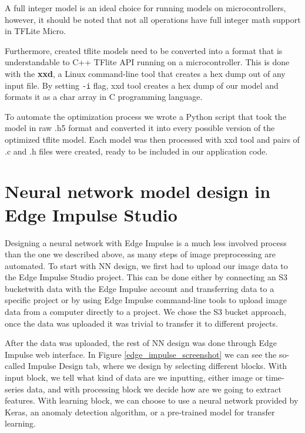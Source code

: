 A full integer model is an ideal choice for running models on microcontrollers, however, it should be noted that not all operations have full integer math support in TFLite Micro.

Furthermore, created tflite models need to be converted into a format that is understandable to C++ TFlite API running on a microcontroller.
This is done with the \textbf{xxd}, a Linux command-line tool that creates a hex dump out of any input file.
By setting \verb|-i| flag, xxd tool creates a hex dump of our model and formats it as a char array in C programming language. 

To automate the optimization process we wrote a Python script that took the model in raw .h5 format and converted it into every possible version of the optimized tflite model.
Each model was then processed with xxd tool and pairs of .c and .h files were created, ready to be included in our application code.


\section{ Neural network model design in Edge Impulse Studio}

Designing a neural network with Edge Impulse is a much less involved process than the one we described above, as many steps of image preprocessing are automated.
To start with NN design, we first had to upload our image data to the Edge Impulse Studio project.
This can be done either by connecting an S3 bucket\footnotemark with data with the Edge Impulse account and transferring data to a specific project or by using Edge Impulse command-line tools to upload image data from a computer directly to a project.
We chose the S3 bucket approach, once the data was uploaded it was trivial to transfer it to different projects.


After the data was uploaded, the rest of NN design was done through Edge Impulse web interface.
In Figure \ref{edge_impulse_screenshot} we can see the so-called Impulse Design tab, where we design by selecting different blocks.
With input block, we tell what kind of data are we inputting, either image or time-series data, and with processing block we decide how are we going to extract features.
With learning block, we can choose to use a neural network provided by Keras, an anomaly detection algorithm, or a pre-trained model for transfer learning.

